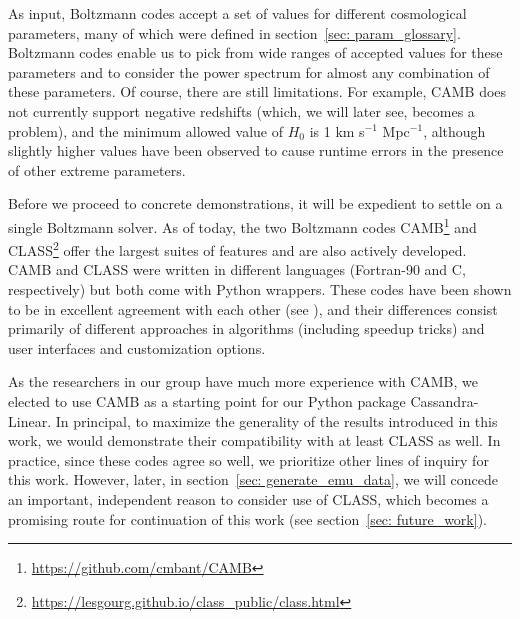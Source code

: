 
As input, Boltzmann codes accept a set of values for different 
cosmological parameters, many of which were defined in section~\ref{sec: 
param_glossary}. Boltzmann codes enable us to pick from wide ranges of 
accepted values for these parameters and to consider the power 
spectrum for almost any combination of these parameters. Of course, there are 
still limitations. For example, CAMB does not currently support negative 
redshifts (which, we will later see, becomes a problem), and the minimum 
allowed value of $H_0$ is 1 km s$^{-1}$ Mpc$^{-1}$, although slightly higher 
values have 
been observed to cause runtime errors in the presence of other extreme 
parameters.


Before we proceed to concrete demonstrations, it will be expedient to settle
on a single Boltzmann solver. As of today, the two Boltzmann codes
CAMB\footnote{\url{https://github.com/cmbant/CAMB}} and
CLASS\footnote{\url{https://lesgourg.github.io/class_public/class.html}} offer
the largest suites of features and are also actively developed. CAMB and
CLASS were written in different languages (Fortran-90 and C, respectively)
but both come with Python wrappers. These codes have been shown to be in 
excellent agreement with each other (see ), and their
differences consist primarily of different approaches in algorithms (including 
speedup tricks) and user interfaces and customization options.

As the researchers in our group have much more experience with CAMB, we 
elected to use CAMB as a starting point for our Python package
Cassandra-Linear. In principal, to maximize the generality of 
the results introduced in this 
work, we would demonstrate their compatibility with at least CLASS as well. In 
practice, since these codes agree so well, we prioritize other lines of 
inquiry
for this work. However, later, in section~\ref{sec: generate_emu_data}, we 
will concede an important, 
independent reason to consider use of CLASS, which becomes a promising route
for continuation of this work (see section~\ref{sec: future_work}).

\begin{comment}
\textcolor{green}{Furthermore, the CLASS documentation
is not nearly as strong as it is with CAMB, and we already encountered
extreme difficulty simply in recreating results already previously obtained
via CAMB!}
\end{comment}

